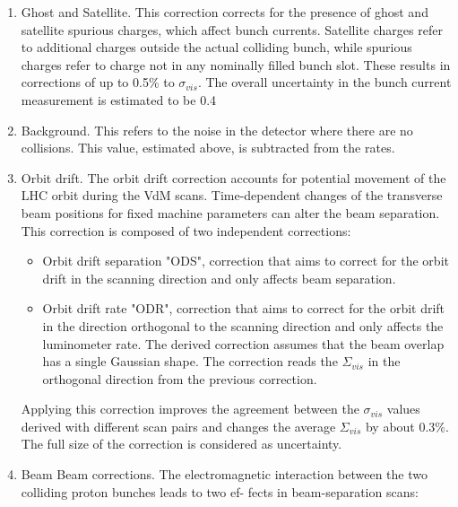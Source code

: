 \begin{enumerate}

\item Ghost and Satellite. This correction corrects for the presence of ghost and satellite spurious charges, which affect bunch currents. Satellite charges refer to additional charges outside the actual colliding bunch, while spurious charges refer to charge not in any nominally filled bunch slot. These results in corrections of up to 0.5\% to $\sigma_{vis}$. The overall uncertainty in the bunch current measurement is estimated to be 0.4%

\item Background. This refers to the noise in the detector where there are no collisions. This value, estimated above, is subtracted from the rates.

\item Orbit drift. The orbit drift correction accounts for potential movement of the LHC orbit during the VdM scans. Time-dependent changes of the transverse beam positions for fixed machine parameters can alter the beam separation. This correction is composed of two independent corrections: 

\begin{itemize}

\item Orbit drift separation "ODS", correction that aims to correct for the orbit drift in the scanning direction and only affects beam separation. 

\item  Orbit drift rate "ODR", correction that aims to correct for the orbit drift in the direction orthogonal to the scanning direction and only affects the luminometer rate. The derived correction assumes that the beam overlap has a single Gaussian shape. The correction reads the $\Sigma_{vis}$ in the orthogonal direction from the previous correction. 
\end{itemize}

Applying this correction improves the agreement between the $\sigma_{vis}$ values derived with different scan pairs and changes the average $\Sigma_{vis}$ by about 0.3\%. The full size of the correction is considered as uncertainty.

\item Beam Beam corrections.  The electromagnetic interaction between the two colliding proton bunches leads to two ef- fects in beam-separation scans:

\begin{itemize}


\end{itemize}
\end{enumerate}

